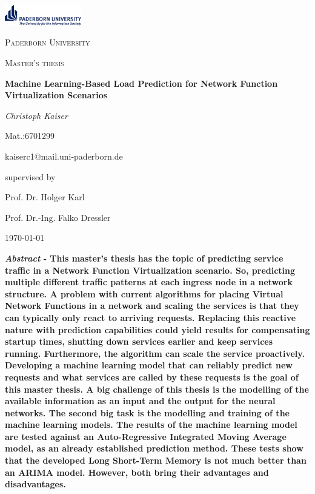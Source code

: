 \documentclass[12pt,a4paper]{scrartcl}
\begin{document}
	\lstset{language=Python}
	
	\begin{titlepage}
		\centering
		\includegraphics[width=0.25\textwidth]{Pictures/UPB_LOGO_KOMP_RGB_GB_2015W}\par\vspace{1cm}
		{\scshape\LARGE Paderborn University\par}
		\vspace{1cm}
		{\scshape\Large Master's thesis\par}
		\vspace{1.5cm}
		{\huge\bfseries Machine Learning-Based Load Prediction for Network Function Virtualization Scenarios\par}
		\vspace{2cm}
		{\Large\itshape Christoph Kaiser\par
			Mat.:6701299\par
			kaiserc1@mail.uni-paderborn.de}
		\vfill
		supervised by\par
		Prof. Dr. Holger Karl\par
		Prof. Dr.-Ing. Falko Dressler
		
		\vfill
		
		{\large \today\par}
	\end{titlepage}
	
	\pagebreak
	\tableofcontents
	\pagebreak	
	\textbf{\textit{Abstract} -
		This master's thesis has the topic of predicting service traffic in a Network Function Virtualization scenario.
		So, predicting multiple different traffic patterns at each ingress node in a network structure.
		A problem with current algorithms for placing Virtual Network Functions in a network and scaling the services is that they can typically only react to arriving requests. 
		Replacing this reactive nature with prediction capabilities could yield results for compensating startup times, shutting down services earlier and keep services running. 
		Furthermore, the algorithm can scale the service proactively.
		Developing a machine learning model that can reliably predict new requests and what services are called by these requests is the goal of this master thesis.
		A big challenge of this thesis is the modelling of the available information as an input and the output for the neural networks.
		The second big task is the modelling and training of the machine learning models.
		The results of the machine learning model are tested against an Auto-Regressive Integrated Moving Average model, as an already established prediction method.
		These tests show that the developed Long Short-Term Memory is not much better than an ARIMA model.
		However, both bring their advantages and disadvantages.}
	
\end{document}
